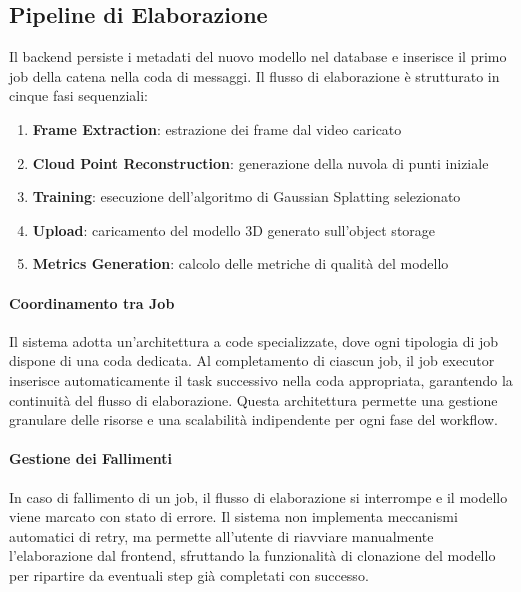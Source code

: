 \subsection{Pipeline di Elaborazione}
Il backend persiste i metadati del nuovo modello nel database e inserisce il primo job della catena nella coda di messaggi. Il flusso di elaborazione è strutturato in cinque fasi sequenziali:
\begin{enumerate}
\item \textbf{Frame Extraction}: estrazione dei frame dal video caricato
\item \textbf{Cloud Point Reconstruction}: generazione della nuvola di punti iniziale
\item \textbf{Training}: esecuzione dell'algoritmo di Gaussian Splatting selezionato
\item \textbf{Upload}: caricamento del modello 3D generato sull'object storage
\item \textbf{Metrics Generation}: calcolo delle metriche di qualità del modello
\end{enumerate}
\paragraph{Coordinamento tra Job}
Il sistema adotta un'architettura a code specializzate, dove ogni tipologia di job dispone di una coda dedicata. Al completamento di ciascun job, il job executor inserisce automaticamente il task successivo nella coda appropriata, garantendo la continuità del flusso di elaborazione. Questa architettura permette una gestione granulare delle risorse e una scalabilità indipendente per ogni fase del workflow.
\paragraph{Gestione dei Fallimenti}
In caso di fallimento di un job, il flusso di elaborazione si interrompe e il modello viene marcato con stato di errore. Il sistema non implementa meccanismi automatici di retry, ma permette all'utente di riavviare manualmente l'elaborazione dal frontend, sfruttando la funzionalità di clonazione del modello per ripartire da eventuali step già completati con successo.


